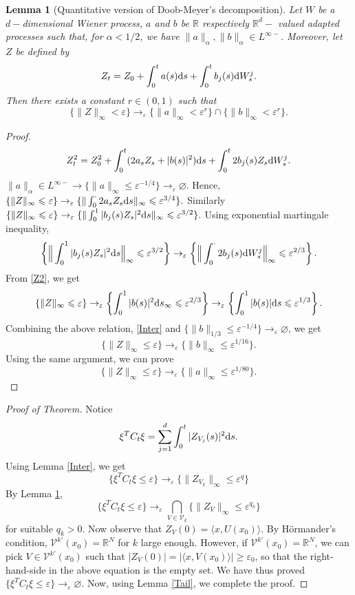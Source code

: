 \documentclass[twoside, 12pt]{book}
\numberwithin{equation}{chapter}
\newtheorem{lemma}[theorem]{Lemma}
\def\mR{{\mathbb R}}
\def\sV{{\mathscr V}}
\def\<{\langle}
\def\>{\rangle}
\def\geq{\geqslant}
\def\leq{\leqslant}
\def\d{\text{\rm{d}}}
\def\eps{\varepsilon}
\begin{document}
	
	\begin{lemma}[Quantitative version of Doob-Meyer's decomposition]\label{Z-to-ab}
	Let $W$ be a $d-$dimensional Wiener process, $a$ and $b$ be $\mR$ respectively $\mR^d-$ valued adapted processes such that, for $\alpha <1/2$, we have $\|a\|_\alpha , \|b\|_\alpha \in L^{\infty-}$. Moreover, let $Z$ be defined by
	$$Z_t=Z_0+\int_0^t a(s)\d s+\int_0^t b_j(s)\d W^j_s. $$
	Then there exists a constant $r\in(0, 1)$ such that
	$$\{\|Z\|_\infty<\eps\} \rightarrow_\eps \{\|a\|_\infty<\eps^r\} \cap\{\|b\|_{\infty}< \eps^r\} .$$
	\end{lemma}
	\begin{proof}
		\begin{align}\label{Z2} Z_t^2=Z_0^2+\int_0^t (2a_sZ_s+|b(s)|^2)\d s+\int_0^t 2b_j(s) Z_s\d W^j_s. \end{align}
		$\|a\|_\alpha \in L^{\infty-}\rightarrow \{\|a\|_\infty\leq \eps^{-1/4}\}\rightarrow_\eps\varnothing. $ Hence, $\{ \|Z\|_\infty\leq \eps\}\rightarrow_\eps \{\|\int_0^\cdot 2a_sZ_s\d s\|_\infty \leq \eps^{3/4}\}. $ Similarly 
		$\{ \|Z\|_\infty\leq \eps\}\rightarrow_\eps \{\|\int_0^1 |b_j(s)Z_s|^2 \d s\|_\infty \leq \eps^{3/2}\}.$ Using exponential martingale inequality, 
		$$\left\{\Big\|\int_0^1 |b_j(s)Z_s|^2 \d s\Big\|_\infty  \leq \eps^{3/2}\right\}\rightarrow_\eps \left\{ \Big\|\int_0^\cdot  2b_j(s)\d W^j_s\Big\|_\infty \leq \eps^{2/3}\right\}. $$
		From \eqref{Z2}, we get 
		$$\{ \|Z\|_\infty\leq \eps\}\rightarrow_\eps \left\{\int_0^1 |b(s)|^2\d s_\infty\leq \eps^{2/3}\right\}\rightarrow_\eps \left\{\int_0^1 |b(s)|\d s\leq \eps^{1/3}\right\}. $$
		Combining the above relation, \eqref{Inter} and $\{\|b\|_{1/3}\leq \eps^{-1/4}\}\rightarrow_\eps\varnothing$, we get 
		$$\{ \|Z\|_\infty\leq \eps\}\rightarrow_\eps \{\|b\|_\infty\leq \eps^{1/16}\}. $$
		Using the same argument, we can prove 
		$$\{ \|Z\|_\infty\leq \eps\}\rightarrow_\eps \{\|a\|_\infty\leq \eps^{1/80}\}. $$
		
	\end{proof}
	
	\begin{proof}[Proof of Theorem]
		Notice 
		\begin{align}\label{CtoZ}\xi^TC_t\xi=\sum_{j=1}^d \int_0^t |Z_{V_j}(s)|^2\d s.\end{align}
		Using Lemma \ref{Inter}, we get 
		$$\{\xi^TC_t\xi\leq \eps\}\rightarrow_\eps \{ \|Z_{V_k}\|_\infty\leq \eps^q\}$$
		By Lemma \ref{Z-to-ab}, 
		$$\{\xi^TC_t\xi\leq \eps\}\rightarrow_\eps \bigcap_{V\in \sV_k}\{ \|Z_{V}\|_\infty\leq \eps^{q_k}\}$$
		for suitable $q_k > 0.$ Now observe that $Z_V (0) = \<x, U (x_0 )\>$. By H\"ormander’s condition, $\sV^{k'}(x_0) = \mR^N$ for $k$ large enough. However, if $\sV^{k'}(x_0) = \mR^N$, we can pick $V \in \sV^{k'}(x_0)$ such that $|Z_V (0)| =|\<x, V (x_0 )\>| \geq \eps_0$, so that the right-hand-side in the above equation is the empty set. We have thus proved $\{\xi^TC_t\xi \leq\eps\} \rightarrow_\eps \varnothing$. Now, using  Lemma \ref{Tail}, we complete the proof.
	\end{proof}
	 
\end{document}
